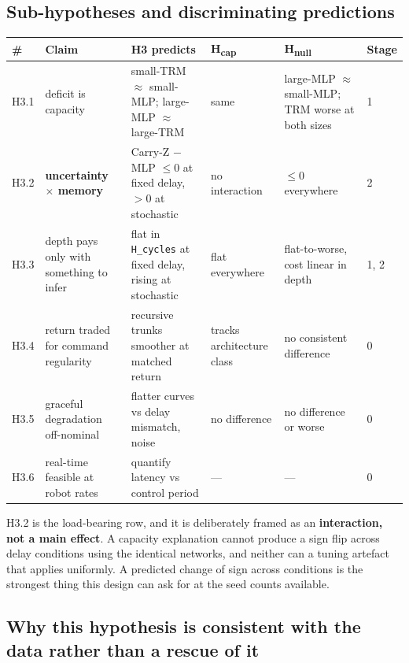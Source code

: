 \documentclass[11pt]{article}
\newcommand{\code}[1]{\texttt{\small #1}}
\begin{document}
\subsection{Sub-hypotheses and discriminating predictions}

\begin{center}\footnotesize
\begin{tabular}{@{}lp{}p{}p{}p{}l@{}}
\toprule
\textbf{\#} & \textbf{Claim} & \textbf{H3 predicts} & \textbf{H\textsubscript{cap}} & \textbf{H\textsubscript{null}} & \textbf{Stage} \\
\midrule
H3.1 & deficit is capacity & small-TRM $\approx$ small-MLP; large-MLP $\approx$ large-TRM & same & large-MLP $\approx$ small-MLP; TRM worse at both sizes & 1 \\
H3.2 & \textbf{uncertainty $\times$ memory} & Carry-Z $-$ MLP $\leq 0$ at fixed delay, \textbf{$> 0$} at stochastic & no interaction & $\leq 0$ everywhere & 2 \\
H3.3 & depth pays only with something to infer & flat in \code{H\_cycles} at fixed delay, rising at stochastic & flat everywhere & flat-to-worse, cost linear in depth & 1, 2 \\
H3.4 & return traded for command regularity & recursive trunks smoother at matched return & tracks architecture class & no consistent difference & 0 \\
H3.5 & graceful degradation off-nominal & flatter curves vs delay mismatch, noise & no difference & no difference or worse & 0 \\
H3.6 & real-time feasible at robot rates & quantify latency vs control period & --- & --- & 0 \\
\bottomrule
\end{tabular}
\end{center}

H3.2 is the load-bearing row, and it is deliberately framed as an \textbf{interaction, not a main effect}. A capacity explanation cannot produce a sign flip across delay conditions using the identical networks, and neither can a tuning artefact that applies uniformly. A predicted change of sign across conditions is the strongest thing this design can ask for at the seed counts available.

\subsection{Why this hypothesis is consistent with the data rather than a rescue of it}
\end{document}

